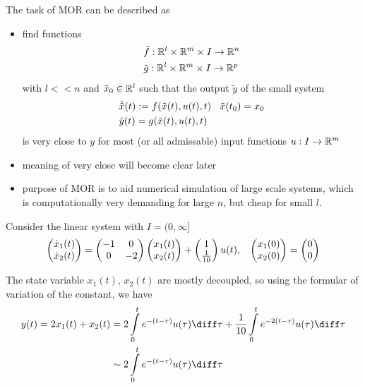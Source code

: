 The task of MOR can be described as 
\begin{itemize}
	\item find functions 
	\begin{align*}
		& \tilde{f} : \mathbb{R}^l \times \mathbb{R}^m \times I  \rightarrow  \mathbb{R}^n \\
		& \tilde{g}: \mathbb{R}^l \times \mathbb{R}^m \times I \rightarrow \mathbb{R}^p
	\end{align*}
	with $l <<n$ and $\tilde{x}_0 \in \mathbb{R}^l$ such that the output $\tilde{y}$ of the small  system 
	\begin{align*}
		& \dot{\tilde{x}}(t) : = f(\tilde{x}(t), u(t), t) \hspace{2ex} \tilde{x}(t_0)=x_0 \\
		& \tilde{y}(t)=g(\tilde{x}(t),u(t),t) 
	\end{align*}
	is very close to $y$ for most (or all admissable) input functions $u:I \rightarrow \mathbb{R}^m$
	\item meaning of very close will become clear later
	\item purpose of MOR is to aid numerical simulation of large scale systems, which is computationally very demanding for large $n$, but cheap for small $l$. 
\end{itemize}

\begin{exa}
	Consider the linear system with $I=(0,\infty]$
	\begin{align*}
		\begin{pmatrix}
			\dot{x}_1(t) \\\dot{x}_2(t) 
		\end{pmatrix}
		= 
		\begin{pmatrix}
			-1 & 0 \\ 0 & -2
		\end{pmatrix}
		\begin{pmatrix}
			x_1(t) \\ x_2(t)
		\end{pmatrix}
		+
		\begin{pmatrix}
			1 \\ \frac{1}{10}
		\end{pmatrix}
		u(t), \hspace{2ex} 
		\begin{pmatrix}
			x_1(0) \\ x_2(0)
		\end{pmatrix}
		= \begin{pmatrix}
			0 \\ 0
		\end{pmatrix}
	\end{align*}
\end{exa}
The state variable $x_1(t)$, $x_2(t)$ are mostly decoupled, so using the formular of variation of the constant, we have
\begin{align*}
	y(t)=2x_1(t)+x_2(t) & = 2 \int\limits_0^t e^{- (t- \tau)} u(\tau) \diff \tau + \frac{1}{10} \int\limits_0^t e^{-2(t - \tau )} u(\tau) \diff \tau \\
	& \sim 2 \int\limits_0^t e^{-(t-\tau)} u(\tau) \diff \tau 
\end{align*}
